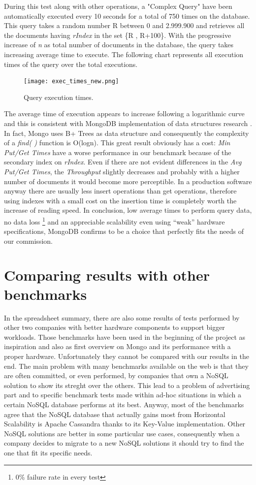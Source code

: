 During this test along with other operations, a "Complex Query" have been automatically executed every 10 seconds for a total of 750 times on the database. This query takes a random number  R between 0 and 2.999.900 and retrieves all the documents having  \textit{rIndex} in the set \{R , R+100\}.
With the progressive increase of \textit{n} as total number of documents in the database, the query takes increasing average time to execute. 
The following chart represents all execution times of the query over the total executions.
\begin{figure}[H]
\texttt{[image: exec\_times\_new.png]}
\centering
\caption{Query execution times.}
\end{figure}
The average time of execution appears to increase following a logarithmic curve and this is consistent with MongoDB implementation of data structures research .
In fact, Mongo uses B+ Trees as data structure and consequently the complexity of a \textit{find( )} function is O(logn).
This great result obviously has a cost: \textit{Min Put/Get Times} have a worse performance in our benchmark  because of the secondary index on \textit{rIndex}. 
Even if  there are not evident differences in the \textit{Avg Put/Get Times}, the \textit{Throughput} slightly decreases and probably with a higher number of documents it would become more perceptible.
In a production software anyway there are usually less insert operations than get operations, therefore using indexes with a small cost on the insertion time is completely worth the increase of reading speed.
In conclusion, low average times to perform query data, no data loss \footnote{0\% failure rate in every test } and an appreciable scalability even using  “weak” hardware specifications, MongoDB confirms to be a choice that perfectly fits the needs of our commission.
\section{Comparing results with other benchmarks}
\label{sec:5}
In the spreadsheet summary, there are also some results of tests performed by other two companies with better hardware components to support bigger workloads. Those benchmarks have been used in the beginning of the project as inspiration and also as first overview on Mongo and its performance with a proper hardware.
Unfortunately they cannot be compared with our results in the end.
The main problem with many benchmarks available on the web is that they are often committed, or even performed, by companies that own a NoSQL solution to show its streght over the others.
This lead to a problem of advertising part and to specific benchmark tests made within ad-hoc situations in which a certain NoSQL database performs at its best.
Anyway, most of the benchmarks agree that the NoSQL database that actually gains most from Horizontal Scalability is Apache Cassandra thanks to its Key-Value implementation.
Other NoSQL solutions are better in some particular use cases, consequently when a company decides to migrate to a new NoSQL solutions  it should try to find the one that fit its specific needs.
